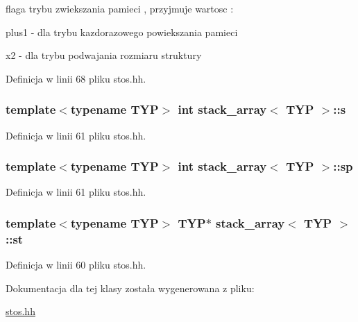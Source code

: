 flaga trybu zwiekszania pamieci , przyjmuje wartosc \-: \par
 plus1 -\/ dla trybu kazdorazowego powiekszania pamieci \par
 x2 -\/ dla trybu podwajania rozmiaru struktury 



\-Definicja w linii 68 pliku stos.\-hh.

\hypertarget{classstack__array_aa5730e580f60bd7b7ba77d762703fbc6}{
\subsubsection[{s}]{\setlength{\rightskip}{0pt plus 5cm}template$<$typename \-T\-Y\-P$>$ int {\bf stack\-\_\-array}$<$ \-T\-Y\-P $>$\-::{\bf s}}}\label{classstack__array_aa5730e580f60bd7b7ba77d762703fbc6}


\-Definicja w linii 61 pliku stos.\-hh.

\hypertarget{classstack__array_a598f4974aca293a20a809788ffe80b15}{
\subsubsection[{sp}]{\setlength{\rightskip}{0pt plus 5cm}template$<$typename \-T\-Y\-P$>$ int {\bf stack\-\_\-array}$<$ \-T\-Y\-P $>$\-::{\bf sp}}}\label{classstack__array_a598f4974aca293a20a809788ffe80b15}


\-Definicja w linii 61 pliku stos.\-hh.

\hypertarget{classstack__array_aa97b399041c2d08b3955bb6436cbcf2f}{
\subsubsection[{st}]{\setlength{\rightskip}{0pt plus 5cm}template$<$typename \-T\-Y\-P$>$ \-T\-Y\-P$\ast$ {\bf stack\-\_\-array}$<$ \-T\-Y\-P $>$\-::{\bf st}}}\label{classstack__array_aa97b399041c2d08b3955bb6436cbcf2f}


\-Definicja w linii 60 pliku stos.\-hh.



\-Dokumentacja dla tej klasy została wygenerowana z pliku\-:\begin{DoxyCompactItemize}
\item 
\hyperlink{stos_8hh}{stos.\-hh}\end{DoxyCompactItemize}
